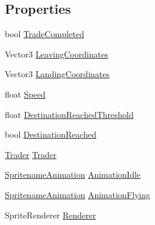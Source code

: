 \subsection*{Properties}
\begin{DoxyCompactItemize}
\item 
bool \hyperlink{class_trader_ship_controller_ab52ebfafff19b41164967473761565c1}{Trade\+Completed}
\item 
Vector3 \hyperlink{class_trader_ship_controller_ab6cc980f84241ca36bc92603020606d3}{Leaving\+Coordinates}
\item 
Vector3 \hyperlink{class_trader_ship_controller_a2f0749c420188a39a138c91496371abc}{Landing\+Coordinates}
\item 
float \hyperlink{class_trader_ship_controller_a0bedd32dc864149cba93467ea019cb44}{Speed}
\item 
float \hyperlink{class_trader_ship_controller_a3ec6bf93e066cbb65ffaed26fda61eb1}{Destination\+Reached\+Threshold}
\item 
bool \hyperlink{class_trader_ship_controller_a54d4ea37a627860c60b5b68a16364f12}{Destination\+Reached}
\item 
\hyperlink{class_trader}{Trader} \hyperlink{class_trader_ship_controller_a94b27220d0d4f24f818c03440e3d5ad2}{Trader}
\item 
\hyperlink{class_animation_1_1_spritename_animation}{Spritename\+Animation} \hyperlink{class_trader_ship_controller_a07bc5b48ef2ba7ce12dd978a5f1d2a95}{Animation\+Idle}
\item 
\hyperlink{class_animation_1_1_spritename_animation}{Spritename\+Animation} \hyperlink{class_trader_ship_controller_a19996dfe9979a8307ef7391b8175abe5}{Animation\+Flying}
\item 
Sprite\+Renderer \hyperlink{class_trader_ship_controller_add91b6762fc3fe9173b8873ad0c4c4ed}{Renderer}
\end{DoxyCompactItemize}


